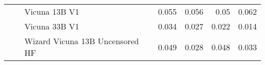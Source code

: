 \begin{table}[!htbp]
\begin{tabular}{l|l|l|rrrr}
 &  & Vicuna 13B V1 & {\cellcolor[HTML]{C1D9ED}} \color[HTML]{000000} 0.055 & {\cellcolor[HTML]{BDD7EC}} \color[HTML]{000000} 0.056 & {\cellcolor[HTML]{C9DDF0}} \color[HTML]{000000} 0.05 & {\cellcolor[HTML]{B0D2E7}} \color[HTML]{000000} 0.062 \\
 &  & Vicuna 33B V1 & {\cellcolor[HTML]{DDEAF7}} \color[HTML]{000000} 0.034 & {\cellcolor[HTML]{E7F0FA}} \color[HTML]{000000} 0.027 & {\cellcolor[HTML]{EEF5FC}} \color[HTML]{000000} 0.022 & {\cellcolor[HTML]{F7FBFF}} \color[HTML]{000000} 0.014 \\
 &  & Wizard Vicuna 13B Uncensored HF & {\cellcolor[HTML]{CADEF0}} \color[HTML]{000000} 0.049 & {\cellcolor[HTML]{E6F0F9}} \color[HTML]{000000} 0.028 & {\cellcolor[HTML]{CCDFF1}} \color[HTML]{000000} 0.048 & {\cellcolor[HTML]{DFEBF7}} \color[HTML]{000000} 0.033 \\

\bottomrule
\end{tabular}
            
\end{table}
